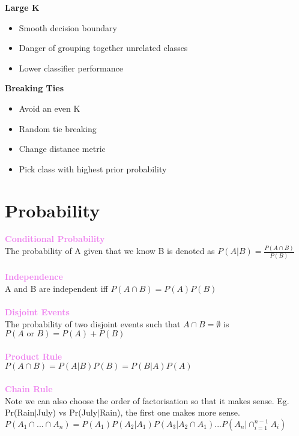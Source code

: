 \documentclass[a4paper,10pt]{article}
\begin{document}
\textbf{Large K}
\begin{itemize}
	\item Smooth decision boundary 
	\item Danger of grouping together unrelated classes 
	\item Lower classifier performance 
\end{itemize}
\textbf{Breaking Ties}
\begin{itemize}
	\item Avoid an even K 
	\item Random tie breaking 
	\item Change distance metric
	\item Pick class with highest prior probability
\end{itemize}
\newpage
\section*{Probability}
\begin{shaded}
	\noindent \textcolor{Violet}{\textbf{Conditional Probability}}\\
	The probability of A given that we know  B is denoted as $P(A | B) = \frac{P(A \cap B)}{P(B)}$ \\\\
	\textcolor{Violet}{\textbf{Independence}}\\
	A and B are independent iff $P(A \cap B) = P(A)P(B)$ \\\\
	\textcolor{Violet}{\textbf{Disjoint Events}}\\
	The probability of two disjoint events such that $A \cap B = \emptyset$ is $P(A \text{ or } B) = P(A) + P(B)$ \\\\
	\textcolor{Violet}{\textbf{Product Rule}}\\
	$P(A \cap B) = P(A|B)P(B) = P(B|A)P(A)$\\\\
	\textcolor{Violet}{\textbf{Chain Rule}}\\
	Note we can also choose the order of factorisation so that it makes sense. Eg. Pr(Rain$|$July) vs Pr(July$|$Rain), the first one makes more sense. \\
	$P(A_{1} \cap ... \cap A_{n}) = P(A_{1})P(A_{2}|A_{1})P(A_{3}|A_{2}\cap A_{1}) ... P(A_{n}|\cap_{i=1}^{n-1}A_{i})$
\end{shaded}
\end{document}

